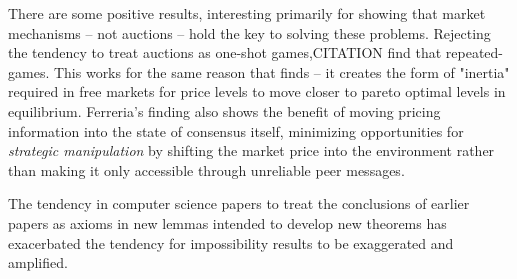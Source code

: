 \documentclass[sigconf,anonymous]{aamas}
\begin{document}
There are some positive results, interesting primarily for showing that market mechanisms -- not auctions -- hold the key to solving these problems. Rejecting the tendency to treat auctions as one-shot games,CITATION find that repeated-games. This works for the same reason that \citet{ferreira2021dynamic} finds -- it creates the form of "inertia" required in free markets for price levels to move closer to pareto optimal levels in equilibrium. Ferreria's finding also shows the benefit of moving pricing information into the state of consensus itself, minimizing opportunities for \textit{strategic manipulation} by shifting the market price into the environment rather than making it only accessible through unreliable peer messages.

The tendency in computer science papers to treat the conclusions of earlier papers as axioms in new lemmas intended to develop new theorems has exacerbated the tendency for impossibility results to be exaggerated and amplified. 
\end{document}
